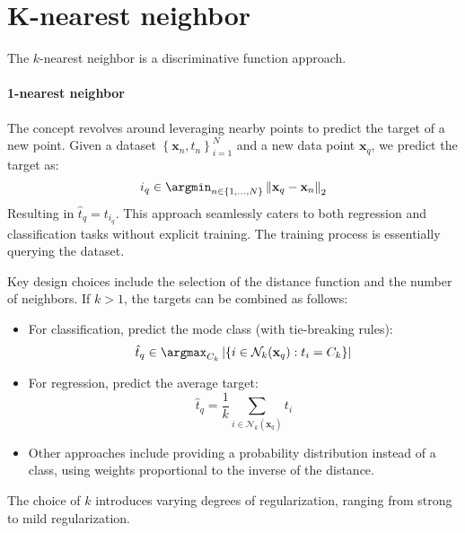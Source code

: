 \section{K-nearest neighbor}

The $k$-nearest neighbor is a discriminative function approach. 

\paragraph*{1-nearest neighbor}
The concept revolves around leveraging nearby points to predict the target of a new point.
Given a dataset ${\left\{ \textbf{x}_n,t_n \right\}}_{i=1}^{N}$ and a new data point $\textbf{x}_q$, we predict the target as:
\[i_q\in \argmin_{n \in \left\{ 1,\dots,N \right\}}\left\lVert \textbf{x}_q-\textbf{x}_n\right\rVert_2 \]
Resulting in $\hat{t}_q=t_{i_q}$. 
This approach seamlessly caters to both regression and classification tasks without explicit training. The training process is essentially querying the dataset.

Key design choices include the selection of the distance function and the number of neighbors. 
If $k>1$, the targets can be combined as follows:
\begin{itemize}
    \item For classification, predict the mode class (with tie-breaking rules):
        \[\hat{t}_q\in\argmax_{C_k}\left\lvert \{ i \in \mathcal{N}_k(\textbf{x}_q):t_i=C_k \}\right\rvert \]
    \item For regression, predict the average target:
        \[\hat{t}_q=\dfrac{1}{k}\sum_{i \in \mathcal{N}_k(\textbf{x}_q)}t_i\]
    \item Other approaches include providing a probability distribution instead of a class, using weights proportional to the inverse of the distance. 
\end{itemize}
The choice of $k$ introduces varying degrees of regularization, ranging from strong to mild regularization.